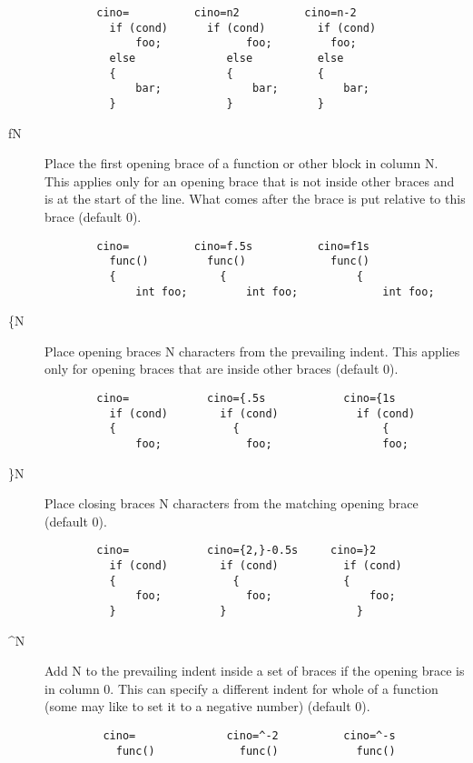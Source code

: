 \begin{description}
\begin{verbatim}
        cino=          cino=n2          cino=n-2
          if (cond)      if (cond)        if (cond)
              foo;             foo;         foo;
          else              else          else
          {                 {             {
              bar;              bar;          bar;
          }                 }             }
\end{verbatim}
\clearpage
    \item[fN] Place the first opening brace of a function or other block in
          column N.  This applies only for an opening brace that is not
          inside other braces and is at the start of the line.  What comes
          after the brace is put relative to this brace (default 0).
\begin{verbatim}
        cino=          cino=f.5s          cino=f1s
          func()         func()             func()
          {                {                    {
              int foo;         int foo;             int foo;
\end{verbatim}
    \item[\{N] Place opening braces N characters from the prevailing indent.
          This applies only for opening braces that are inside other
          braces  (default 0).
\begin{verbatim}
        cino=            cino={.5s            cino={1s
          if (cond)        if (cond)            if (cond)
          {                  {                      {
              foo;             foo;                 foo;
 \end{verbatim}
    \item[\}N] Place closing braces N characters from the matching opening
          brace  (default 0).
\begin{verbatim}
        cino=            cino={2,}-0.5s     cino=}2
          if (cond)        if (cond)          if (cond)
          {                  {                {
              foo;             foo;               foo;
          }                }                    }
 \end{verbatim}
 \clearpage
    \item[\^{}N] Add N to the prevailing indent inside a set of braces if the
          opening brace is in column 0.  This can specify a different
          indent for whole of a function (some may like to set it to a
          negative number)  (default 0).
\begin{verbatim}
         cino=              cino=^-2          cino=^-s
           func()             func()            func()

\end{verbatim}
\end{description}
